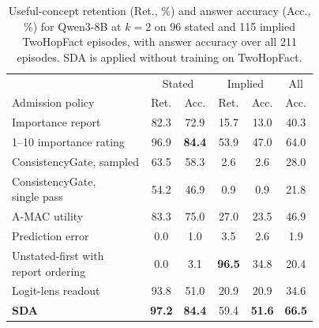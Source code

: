 \begin{table}[!htbp]
\centering
\caption{Useful-concept retention (Ret., \%) and answer accuracy (Acc., \%) for Qwen3-8B at $k=2$ on 96 stated and 115 implied TwoHopFact episodes, with answer accuracy over all 211 episodes. SDA is applied without training on TwoHopFact.}
\label{tab:twohopsplit}
\footnotesize
\setlength{\tabcolsep}{2.2pt}
\begin{tabular}{lccccc}
\toprule
 & \multicolumn{2}{c}{Stated} & \multicolumn{2}{c}{Implied} & All \\
\cmidrule(lr){2-3}\cmidrule(lr){4-5}\cmidrule(lr){6-6}
Admission policy & Ret. & Acc. & Ret. & Acc. & Acc. \\
\midrule
Importance report & 82.3 & 72.9 & 15.7 & 13.0 & 40.3 \\
1--10 importance rating & 96.9 & \textbf{84.4} & 53.9 & 47.0 & 64.0 \\
ConsistencyGate, sampled & 63.5 & 58.3 & 2.6 & 2.6 & 28.0 \\
\shortstack[l]{ConsistencyGate,\\\quad single pass} & 54.2 & 46.9 & 0.9 & 0.9 & 21.8 \\
A-MAC utility & 83.3 & 75.0 & 27.0 & 23.5 & 46.9 \\
Prediction error & 0.0 & 1.0 & 3.5 & 2.6 & 1.9 \\
\shortstack[l]{Unstated-first with\\\quad report ordering} & 0.0 & 3.1 & \textbf{96.5} & 34.8 & 20.4 \\
Logit-lens readout & 93.8 & 51.0 & 20.9 & 20.9 & 34.6 \\
\textbf{SDA} & \textbf{97.2} & \textbf{84.4} & 59.4 & \textbf{51.6} & \textbf{66.5} \\

\bottomrule
\end{tabular}
\end{table}
